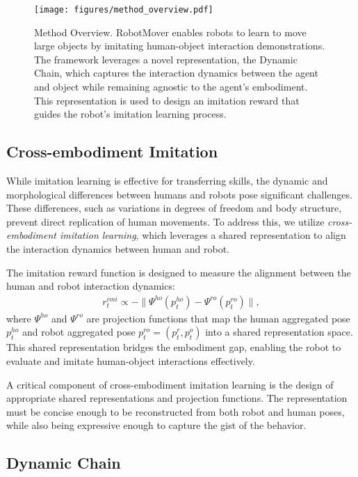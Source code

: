 \begin{figure}[t]
\centering
\texttt{[image: figures/method\_overview.pdf]}
\caption{Method Overview. RobotMover enables robots to learn to move large objects by imitating human-object interaction demonstrations. The framework leverages a novel representation, the Dynamic Chain, which captures the interaction dynamics between the agent and object while remaining agnostic to the agent’s embodiment. This representation is used to design an imitation reward that guides the robot’s imitation learning process.}
\label{fig:overview}
\vspace{-0.5cm}
\end{figure}


\subsection{Cross-embodiment Imitation}
While imitation learning is effective for transferring skills, the dynamic and morphological differences between humans and robots pose significant challenges. These differences, such as variations in degrees of freedom and body structure, prevent direct replication of human movements. To address this, we utilize \textit{cross-embodiment imitation learning}, which leverages a shared representation to align the interaction dynamics between human and robot.

The imitation reward function is designed to measure the alignment between the human and robot interaction dynamics:
\begin{align}
\label{eqn:imit_reward}
    r^{imi}_t \propto -\| \Psi^{ho}(p^{ho}_t) - \Psi^{ro}(p^{ro}_t) \|,
\end{align}
where $\Psi^{ho}$ and $\Psi^{ro}$ are projection functions that map the human aggregated pose $p^{ho}_t$ and robot aggregated pose $p^{ro}_t = (p^r_t, p^o_t)$ into a shared representation space. This shared representation bridges the embodiment gap, enabling the robot to evaluate and imitate human-object interactions effectively.

A critical component of cross-embodiment imitation learning is the design of appropriate shared representations and projection functions. 
The representation must be concise enough to be reconstructed from both robot and human poses, while also being expressive enough to capture the gist of the behavior.




\subsection{Dynamic Chain}
\label{Method:Dynamic Chain}


